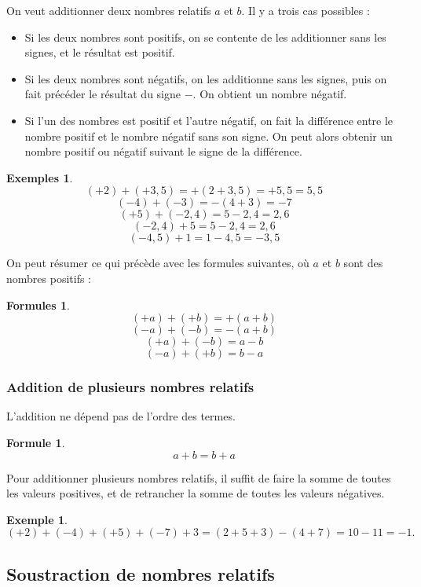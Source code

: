 \documentclass[12 pt]{article}
\theoremstyle{plain}
\newcounter{n}
\numberwithin{n}{section}
\newtheorem*{ex}{Exemple}
\newtheorem*{exs}{Exemples}
\newtheorem*{formule}{Formule}
\newtheorem*{formules}{Formules}
\begin{document}
On veut additionner deux nombres relatifs $a$ et $b$. Il y a trois cas possibles : 

\begin{itemize}
\item Si les deux nombres sont positifs, on se contente de les additionner sans les signes, et le résultat est positif. 

\item Si les deux nombres sont négatifs, on les additionne sans les signes, puis on fait précéder le résultat du signe $-$. On obtient un nombre négatif. 

\item Si l'un des nombres est positif et l'autre négatif, on fait la différence entre le nombre positif et le nombre
négatif sans son signe. On peut alors obtenir un nombre positif ou négatif suivant le signe de la différence. 

\end{itemize}
\begin{exs}
\[(+ 2) + (+3, 5) = +(2+3,5) = + 5,5 = 5,5\]
\[ (- 4 )+ (-3) = - (4+3) = -7\]
\[ (+ 5) + (-2, 4) = 5 - 2,4 = 2,6\]
\[ (-2,4) + 5 =  5 - 2,4 = 2,6\]
\[ (-4,5) + 1 = 1 - 4,5 = - 3,5\]

\end{exs}

On peut résumer ce qui précède avec les formules suivantes, où $a$ et $b$ sont des nombres positifs : 
\begin{formules}
\[ (+ a) + (+b) = + (a+b)\]
\[ (- a) + (-b) = - (a+b) \]
\[ (+a) + (-b) = a-b\]
\[ (-a) + (+b) = b-a\]

\end{formules}

\subsubsection{Addition de plusieurs nombres relatifs}
L'addition ne dépend pas de l'ordre des termes. 
\begin{formule}
\[a+b = b+a\]
\end{formule}

Pour additionner plusieurs nombres relatifs, il suffit de faire la somme de toutes les valeurs 
positives, et de retrancher la somme de toutes les valeurs négatives.
\begin{ex} \[ (+2) +  (-4) + (+5) + (-7) + 3 = (2 + 5 + 3) - (4+ 7) = 10 - 11 = -1.\]
\end{ex}

\subsection{Soustraction de nombres relatifs}
\end{document}
